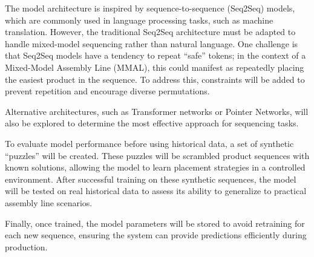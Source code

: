 \documentclass[12pt,a4paper]{report}
\begin{document}
The model architecture is inspired by sequence-to-sequence (Seq2Seq) models, which are commonly used in language processing tasks, such as machine translation. However, the traditional Seq2Seq architecture must be adapted to handle mixed-model sequencing rather than natural language. One challenge is that Seq2Seq models have a tendency to repeat “safe” tokens; in the context of a Mixed-Model Assembly Line (MMAL), this could manifest as repeatedly placing the easiest product in the sequence. To address this, constraints will be added to prevent repetition and encourage diverse permutations.  

Alternative architectures, such as Transformer networks or Pointer Networks, will also be explored to determine the most effective approach for sequencing tasks.  

To evaluate model performance before using historical data, a set of synthetic “puzzles” will be created. These puzzles will be scrambled product sequences with known solutions, allowing the model to learn placement strategies in a controlled environment. After successful training on these synthetic sequences, the model will be tested on real historical data to assess its ability to generalize to practical assembly line scenarios.

Finally, once trained, the model parameters will be stored to avoid retraining for each new sequence, ensuring the system can provide predictions efficiently during production.

\end{document}
